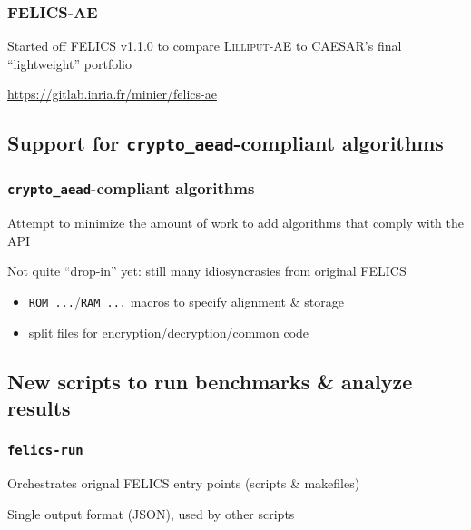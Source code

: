 \documentclass[english]{beamer}
\begin{document}
\begin{frame}
  \frametitle{FELICS-AE}

  Started off FELICS v1.1.0 to compare \textsc{Lilliput-AE} to CAESAR's final ``lightweight'' portfolio

  {\url{https://gitlab.inria.fr/minier/felics-ae}}
\end{frame}

\subsection{Support for \texttt{crypto\_aead}-compliant algorithms}

\begin{frame}
  \frametitle{\texttt{crypto\_aead}-compliant algorithms}

  Attempt to minimize the amount of work to add algorithms that comply with the API


  Not quite ``drop-in'' yet: still many idiosyncrasies from original FELICS

  \begin{itemize}
  \item \texttt{ROM\_...}/\texttt{RAM\_...} macros to specify alignment \& storage
  \item split files for encryption/decryption/common code
  \end{itemize}

\end{frame}

\subsection{New scripts to run benchmarks \& analyze results}

\begin{frame}
  \frametitle{\texttt{felics-run}}

  Orchestrates orignal FELICS entry points (scripts \& makefiles)

  Single output format (JSON), used by other scripts

\end{frame}
\end{document}
